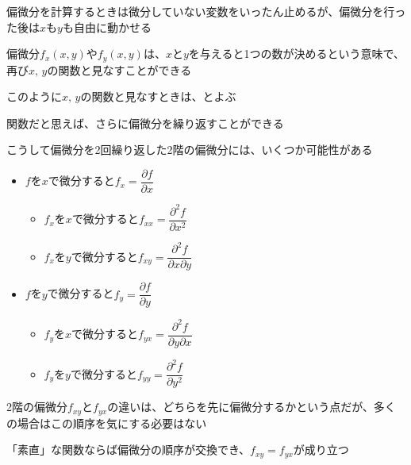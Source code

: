 \documentclass[../book_jiriki_calc]{subfiles}
\begin{document}
\sectionline

偏微分を計算するときは微分していない変数をいったん止めるが、偏微分を行った後は$x$も$y$も自由に動かせる

\br

偏微分$f_x(x, y)$や$f_y(x, y)$は、$x$と$y$を与えると1つの数が決めるという意味で、再び$x, \, y$の関数と見なすことができる

このように$x,\,y$の関数と見なすときは、とよぶ

\br

関数だと思えば、さらに偏微分を繰り返すことができる

こうして偏微分を2回繰り返した2階の偏微分には、いくつか可能性がある

\begin{itemize}
  \item $f$を$x$で微分すると$f_x = \dfrac{\partial f}{\partial x}$
        \begin{itemize}
          \item $f_x$を$x$で微分すると$f_{xx} = \dfrac{\partial^2 f}{\partial x^2}$
          \item $f_x$を$y$で微分すると$f_{xy} = \dfrac{\partial^2 f}{\partial x \partial y}$
        \end{itemize}
  \item $f$を$y$で微分すると$f_y = \dfrac{\partial f}{\partial y}$
        \begin{itemize}
          \item $f_y$を$x$で微分すると$f_{yx} = \dfrac{\partial^2 f}{\partial y \partial x}$
          \item $f_y$を$y$で微分すると$f_{yy} = \dfrac{\partial^2 f}{\partial y^2}$
        \end{itemize}
\end{itemize}

2階の偏微分$f_{xy}$と$f_{yx}$の違いは、どちらを先に偏微分するかという点だが、多くの場合はこの順序を気にする必要はない

「素直」な関数ならば偏微分の順序が交換でき、$f_{xy} = f_{yx}$が成り立つ
\end{document}
